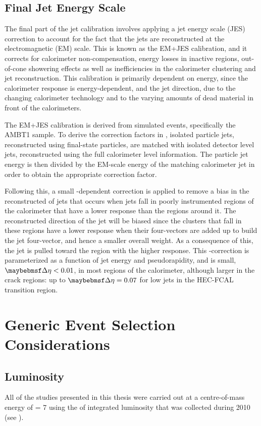 \subsection{Final Jet Energy Scale}
\label{sec:analysis-tools:final_JES}
The final part of the jet calibration involves applying a jet energy scale (JES) correction to account for the fact that the jets are reconstructed at the
electromagnetic (EM) scale.
This is known as the EM+JES calibration, and it corrects for  calorimeter non-compensation, energy losses in inactive regions, out-of-cone showering effects as well as inefficiencies in the calorimeter clustering and jet reconstruction.
This calibration is primarily dependent on energy, since the calorimeter response is energy-dependent, and the jet direction, due to the changing calorimeter technology and to the varying amounts of dead material in front of the calorimeters.

The EM+JES calibration is derived from simulated events, specifically the AMBT1 \Pythia \dijet sample.
To derive the correction factors in \MC, isolated particle jets, reconstructed using final-state particles, are matched with isolated detector level jets, reconstructed using the full calorimeter level information.
The particle jet energy is then divided by the EM-scale energy of the matching calorimeter jet in order to obtain the appropriate correction factor.

Following this, a small \pseudorap-dependent correction is applied to remove a bias in the reconstructed \pseudorap of jets that occurs when jets fall in poorly instrumented regions of the calorimeter that have a lower response than the regions around it.
The reconstructed direction of the jet will be biased since the clusters that fall in these regions have a lower response when their four-vectors are added up to build the jet four-vector, and hence a smaller overall weight.
As a consequence of this, the jet is pulled toward the region with the higher response.
This \pseudorap-correction is parameterized as a function of jet energy and pseudorapidity, and is small, $\DeltaEta < 0.01$, in most regions of the calorimeter, although larger in the crack regions: up to $\DeltaEta = 0.07$ for low \pT jets in the HEC-FCAL transition region.

\section{Generic Event Selection Considerations}
\label{sec:analysis-tools:data_selection}
\subsection{Luminosity}
All of the studies presented in this thesis were carried out at a centre-of-mass
energy of \rootS = \unit{7}{\TeV} using the \twentytenlumi of integrated
luminosity that was collected during 2010 (see ).

